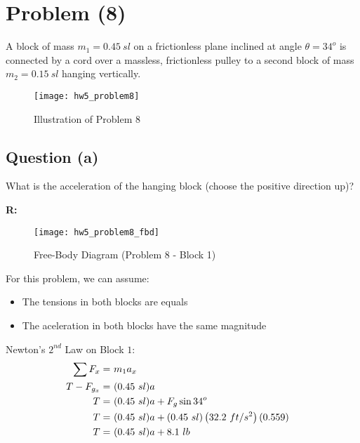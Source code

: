 \section{Problem (8)}
	A block of mass $m_{1} = 0.45 \ sl$ on a frictionless plane inclined at angle $\theta = 34^{o}$ is connected by a cord over a massless, frictionless pulley to a second block of mass $m_{2} = 0.15 \ sl$ hanging vertically.

	\begin{figure}[H]
		\begin{center}
			\texttt{[image: hw5\_problem8]}
			\caption{Illustration of Problem 8}
			\label{fig:hw5_problem8}
		\end{center}
	\end{figure}

	\subsection{Question (a)}

		What is the acceleration of the hanging block (choose the positive direction up)?

		\textbf{R:} \newline

		\begin{figure}[H]
			\begin{center}
				\texttt{[image: hw5\_problem8\_fbd]}
				\caption{Free-Body Diagram (Problem 8 - Block 1)}
				\label{fig:hw5_problem8_fbd}
			\end{center}
		\end{figure}

		For this problem, we can assume:
		\begin{itemize}
			\item{The tensions in both blocks are equals}
			\item{The aceleration in both blocks have the same magnitude}
		\end{itemize}

		Newton's $2^{nd}$ Law on Block $1$:
		\begin{align}
			\sum F_{x} = \ &m_{1}a_{x}& \notag \\
			T - F_{g_{x}} = \ &(0.45 \ sl)a& \notag \\
			T = \ &(0.45 \ sl)a + F_{g} \sin 34^{o}& \notag \\
			T = \ &(0.45 \ sl)a + (0.45 \ sl)\left(32.2 \ ft/s^{2}\right)(0.559)& \notag \\
			T = \ &(0.45 \ sl)a + 8.1 \ lb& \notag
		\end{align}

